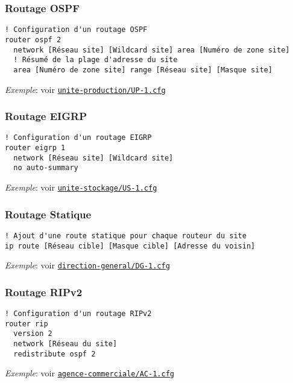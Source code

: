 \documentclass{article}
\newcommand{\seefile}[1]{
  \begin{center}
  \begin{minipage}{0.9\textwidth}
    \emph{Exemple}: voir \texttt{\href{https://github.com/EpicKiwi/Wide-Network-Project-Cesi-A4/blob/master/network/#1}{#1}}
  \end{minipage}
  \end{center}
}
\begin{document}
\subsubsection{Routage OSPF}

\begin{lstlisting}[caption=Configuration d'un routeur de site avec OSPF]
! Configuration d'un routage OSPF
router ospf 2
  network [Réseau site] [Wildcard site] area [Numéro de zone site]
  ! Résumé de la plage d'adresse du site
  area [Numéro de zone site] range [Réseau site] [Masque site]
\end{lstlisting}

\seefile{unite-production/UP-1.cfg}

\subsubsection{Routage EIGRP}

\begin{lstlisting}[caption=Configuration d'un routeur de site avec EIGRP]
! Configuration d'un routage EIGRP
router eigrp 1
  network [Réseau site] [Wildcard site]
  no auto-summary
\end{lstlisting}

\seefile{unite-stockage/US-1.cfg}

\subsubsection{Routage Statique}

\begin{lstlisting}[caption=Configuration d'un routeur de site avec routage statique]
! Ajout d'une route statique pour chaque routeur du site
ip route [Réseau cible] [Masque cible] [Adresse du voisin]
\end{lstlisting}

\seefile{direction-general/DG-1.cfg}

\subsubsection{Routage RIPv2}

\begin{lstlisting}[caption=Configuration d'un routeur de site avec RIPv2]
! Configuration d'un routage RIPv2
router rip
  version 2
  network [Réseau du site]
  redistribute ospf 2
\end{lstlisting}

\seefile{agence-commerciale/AC-1.cfg}
\end{document}
